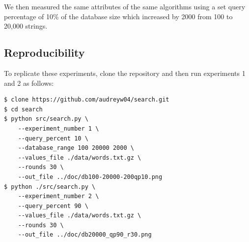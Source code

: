 \documentclass[11pt, letterpaper]{article}
\begin{document}
We then measured the same attributes of the same algorithms using a set query 
percentage of 10\% of the database size which increased by 2000 from 100 to 20,000 
strings.

\subsection{Reproducibility}

To replicate these experiments, clone the repository and then run experiments 1 and 2 as follows:
\begin{verbatim}
$ clone https://github.com/audreyw04/search.git
$ cd search
$ python src/search.py \
    --experiment_number 1 \
    --query_percent 10 \
    --database_range 100 20000 2000 \
    --values_file ./data/words.txt.gz \
    --rounds 30 \
    --out_file ../doc/db100-20000-200qp10.png 
$ python ./src/search.py \
    --experiment_number 2 \
    --query_percent 90 \
    --values_file ./data/words.txt.gz \
    --rounds 30 \
    --out_file ../doc/db20000_qp90_r30.png
\end{verbatim}
\end{document}
